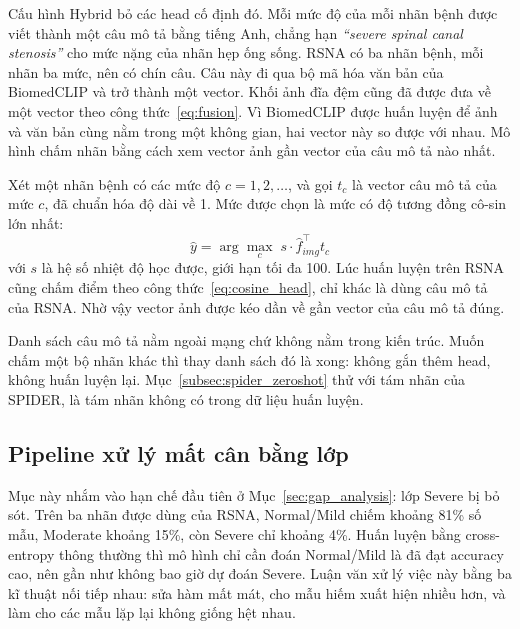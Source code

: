 Cấu hình Hybrid bỏ các head cố định đó. Mỗi mức độ của mỗi nhãn bệnh được viết thành một câu mô tả bằng tiếng Anh, chẳng hạn \textit{``severe spinal canal stenosis''} cho mức nặng của nhãn hẹp ống sống. RSNA có ba nhãn bệnh, mỗi nhãn ba mức, nên có chín câu. Câu này đi qua bộ mã hóa văn bản của BiomedCLIP và trở thành một vector. Khối ảnh đĩa đệm cũng đã được đưa về một vector theo công thức~\eqref{eq:fusion}. Vì BiomedCLIP được huấn luyện để ảnh và văn bản cùng nằm trong một không gian, hai vector này so được với nhau. Mô hình chấm nhãn bằng cách xem vector ảnh gần vector của câu mô tả nào nhất.

Xét một nhãn bệnh có các mức độ $c = 1, 2, \dots$, và gọi $t_c$ là vector câu mô tả của mức $c$, đã chuẩn hóa độ dài về 1. Mức được chọn là mức có độ tương đồng cô-sin lớn nhất:
\begin{equation}
    \hat{y} = \arg\max_{c} \; s \cdot \hat{f}_{img}^{\top} t_c
    \label{eq:cosine_head}
\end{equation}
với $s$ là hệ số nhiệt độ học được, giới hạn tối đa 100. Lúc huấn luyện trên RSNA cũng chấm điểm theo công thức~\eqref{eq:cosine_head}, chỉ khác là dùng câu mô tả của RSNA. Nhờ vậy vector ảnh được kéo dần về gần vector của câu mô tả đúng.

Danh sách câu mô tả nằm ngoài mạng chứ không nằm trong kiến trúc. Muốn chấm một bộ nhãn khác thì thay danh sách đó là xong: không gắn thêm head, không huấn luyện lại. Mục~\ref{subsec:spider_zeroshot} thử với tám nhãn của SPIDER, là tám nhãn không có trong dữ liệu huấn luyện.

\subsection{Pipeline xử lý mất cân bằng lớp}
\label{subsec:imbalance}

Mục này nhắm vào hạn chế đầu tiên ở Mục~\ref{sec:gap_analysis}: lớp Severe bị bỏ sót. Trên ba nhãn được dùng của RSNA, Normal/Mild chiếm khoảng 81\% số mẫu, Moderate khoảng 15\%, còn Severe chỉ khoảng 4\%. Huấn luyện bằng cross-entropy thông thường thì mô hình chỉ cần đoán Normal/Mild là đã đạt accuracy cao, nên gần như không bao giờ dự đoán Severe. Luận văn xử lý việc này bằng ba kĩ thuật nối tiếp nhau: sửa hàm mất mát, cho mẫu hiếm xuất hiện nhiều hơn, và làm cho các mẫu lặp lại không giống hệt nhau.

